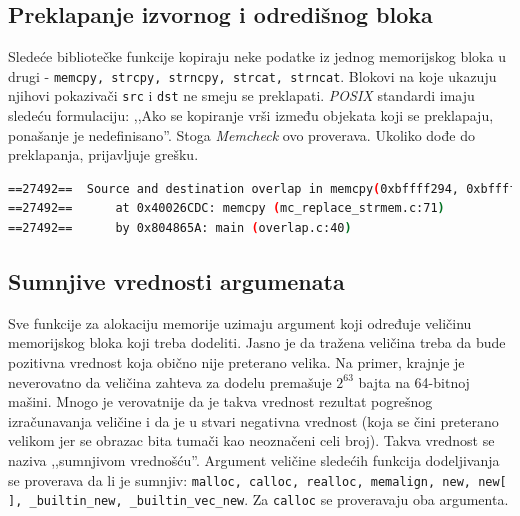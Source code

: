 \documentclass[12pt,oneside]{memoir}
\theoremstyle{plain}
\theoremstyle{definition}
\begin{document}
\subsection{Preklapanje izvornog i odredišnog bloka}
Sledeće bibliotečke funkcije kopiraju neke podatke iz jednog memorijskog bloka u drugi - \texttt{memcpy, strcpy, strncpy, strcat, strncat}.  Blokovi na koje ukazuju njihovi pokazivači \texttt{src} i \texttt{dst} ne smeju se preklapati. \textit{POSIX} standardi imaju sledeću formulaciju: ,,Ako se kopiranje vrši između objekata koji se preklapaju, ponašanje je nedefinisano''.  Stoga \textit{Memcheck} ovo proverava. Ukoliko dođe do preklapanja, prijavljuje grešku.

\begin{lstlisting}[style=terminal,caption={Primer ispisa greške preklapanja izvornog i odredišnog bloka \cite{Memcheck}}, label={lst:slika2.10},language={bash}] 
==27492==  Source and destination overlap in memcpy(0xbffff294, 0xbffff280, 21)
==27492==      at 0x40026CDC: memcpy (mc_replace_strmem.c:71)
==27492==      by 0x804865A: main (overlap.c:40)
\end{lstlisting}


\subsection{Sumnjive vrednosti argumenata}
Sve funkcije za alokaciju memorije uzimaju argument koji određuje veličinu memorijskog bloka koji treba dodeliti. Jasno je da tražena veličina treba da bude pozitivna vrednost koja obično nije preterano velika. Na primer, krajnje je neverovatno da veličina zahteva za dodelu premašuje ${2}^{63}$ bajta na 64-bitnoj mašini. Mnogo je verovatnije da je takva vrednost rezultat pogrešnog izračunavanja veličine i da je u stvari negativna vrednost (koja se čini preterano velikom jer se obrazac bita tumači kao neoznačeni celi broj). Takva vrednost se naziva ,,sumnjivom vrednošću''. Argument veličine sledećih funkcija dodeljivanja  se proverava da li je sumnjiv: \texttt{malloc, calloc, realloc, memalign, new, new[ ], \_builtin\_new, \_builtin\_vec\_new}. Za \texttt{calloc} se proveravaju oba argumenta.
\end{document}
